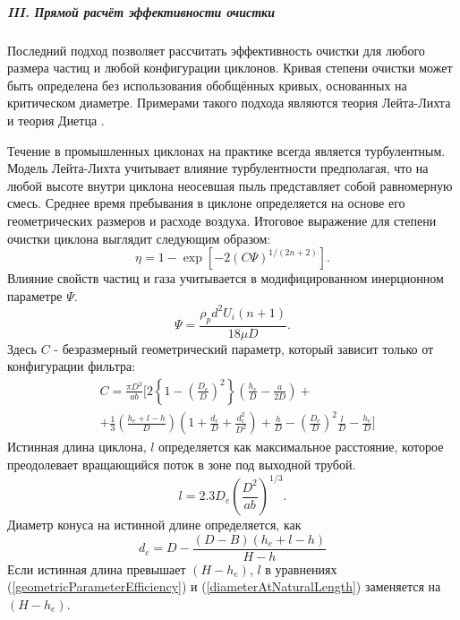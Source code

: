 			\subparagraph{III. Прямой расчёт эффективности очистки\\}

			Последний подход позволяет рассчитать эффективность очистки для любого размера частиц и любой конфигурации циклонов. Кривая степени очистки может быть определена без использования обобщённых кривых, основанных на критическом диаметре. Примерами такого подхода являются теория Лейта-Лихта \cite{LeithLicht} и теория Диетца \cite{Dietz}.
			
			Течение в промышленных циклонах на практике всегда является турбулентным. Модель Лейта-Лихта учитывает влияние турбулентности предполагая, что на любой высоте внутри циклона неосевшая пыль представляет собой равномерную смесь. Среднее время пребывания в циклоне определяется на основе его геометрических размеров и расходе воздуха. Итоговое выражение для степени очистки циклона выглядит следующим образом:
			\begin{equation}
				\eta = 1 - \exp[-2 (C\Psi)^{1/(2n+2)}].
			\end{equation}
			Влияние свойств частиц и газа учитывается в модифицированном инерционном параметре $\Psi$.
			\begin{equation}
				\Psi = \frac{\rho_p d^2 U_i (n+1)}{18 \mu D}.
			\end{equation}
			Здесь $C$ - безразмерный геометрический параметр, который зависит только от конфигурации фильтра:
			\begin{equation}
				\begin{aligned}
					\label{geometricParameterEfficiency}
					&C = \frac{\pi D^2}{ab} \Bigg[ 2 \left\lbrace 1 - \left( \frac{D_e}{D}\right)^2 \right\rbrace\left( \frac{h_e}{D} - \frac{a}{2D} \right) + \\ &+ \frac{1}{3} \left( \frac{h_e + l - h}{D} \right)\left( 1+\frac{d_c}{D} + \frac{d_c^2}{D^2}  \right) + \frac{h}{D} - \left( \frac{D_e}{D} \right)^2\frac{l}{D} - \frac{h_e}{D}\Bigg]			
				\end{aligned}
			\end{equation}
			Истинная длина циклона, $l$ определяется как максимальное расстояние, которое преодолевает вращающийся поток в зоне под выходной трубой. 
			\begin{equation}
				\label{naturalLength}
				l = 2.3D_e\left(\frac{D^2}{ab}\right)^{1/3}.
			\end{equation}
			Диаметр конуса на истинной длине определяется, как
			\begin{equation}
			\label{diameterAtNaturalLength}
				d_c = D - \frac{(D-B)(h_e + l -h)}{H - h}
			\end{equation}
			Если истинная длина превышает $(H-h_e)$, $l$ в уравнениях (\ref{geometricParameterEfficiency}) и (\ref{diameterAtNaturalLength}) заменяется на $(H - h_e)$.
			
